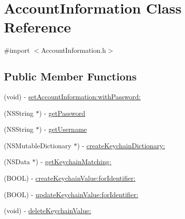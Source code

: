\hypertarget{interface_account_information}{\section{Account\-Information Class Reference}
\label{interface_account_information}
}


{\ttfamily \#import $<$Account\-Information.\-h$>$}

\subsection*{Public Member Functions}
\begin{DoxyCompactItemize}
\item 
(void) -\/ \hyperlink{interface_account_information_a57d1b8a52c03e0f2329d91acf7a44615}{set\-Account\-Information\-:with\-Password\-:}
\item 
(N\-S\-String $\ast$) -\/ \hyperlink{interface_account_information_aa6cf5699117342cb3281be8eb1a58faa}{get\-Password}
\item 
(N\-S\-String $\ast$) -\/ \hyperlink{interface_account_information_acc90f61bbede4e24fc619a06a1b05c9b}{get\-Username}
\item 
(N\-S\-Mutable\-Dictionary $\ast$) -\/ \hyperlink{interface_account_information_a2118b7b2ffebf4b5f3c8d03c26656db7}{create\-Keychain\-Dictionary\-:}
\item 
(N\-S\-Data $\ast$) -\/ \hyperlink{interface_account_information_af06185bbeb72f1ec4e63922fa048c750}{get\-Keychain\-Matching\-:}
\item 
(B\-O\-O\-L) -\/ \hyperlink{interface_account_information_aabb44096ce7033f1e155ce5a780751af}{create\-Keychain\-Value\-:for\-Identifier\-:}
\item 
(B\-O\-O\-L) -\/ \hyperlink{interface_account_information_acea86a9b5e9abcb98f3d1f491291c722}{update\-Keychain\-Value\-:for\-Identifier\-:}
\item 
(void) -\/ \hyperlink{interface_account_information_a7d09bb51ae9b324ce4d01294e8abf08e}{delete\-Keychain\-Value\-:}
\end{DoxyCompactItemize}


